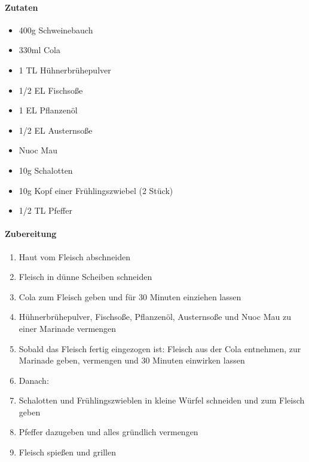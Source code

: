 \newpage
{}

\paragraph{Zutaten}
\begin{itemize}[noitemsep]
	\item 400g Schweinebauch
	\item 330ml Cola
	\item 1 TL Hühnerbrühepulver
	\item 1/2 EL Fischsoße
	\item 1 EL Pflanzenöl
	\item 1/2 EL Austernsoße
	\item Nuoc Mau
	\item 10g Schalotten 
	\item 10g Kopf einer Frühlingszwiebel (2 Stück)
	\item 1/2 TL Pfeffer
\end{itemize}


\paragraph{Zubereitung}
\begin{enumerate}[noitemsep]
	\item Haut vom Fleisch abschneiden
	\item Fleisch in dünne Scheiben schneiden
	\item Cola zum Fleisch geben und für 30 Minuten einziehen lassen
	\item Hühnerbrühepulver, Fischsoße, Pflanzenöl, Austernsoße und Nuoc Mau zu einer Marinade vermengen
	\item Sobald das Fleisch fertig eingezogen ist: Fleisch aus der Cola entnehmen, zur Marinade geben, vermengen und 30 Minuten einwirken lassen
	\item Danach: 
	\item Schalotten und Frühlingszwieblen in kleine Würfel schneiden und zum Fleisch geben
	\item Pfeffer dazugeben und alles gründlich vermengen
	\item Fleisch spießen und grillen
\end{enumerate}